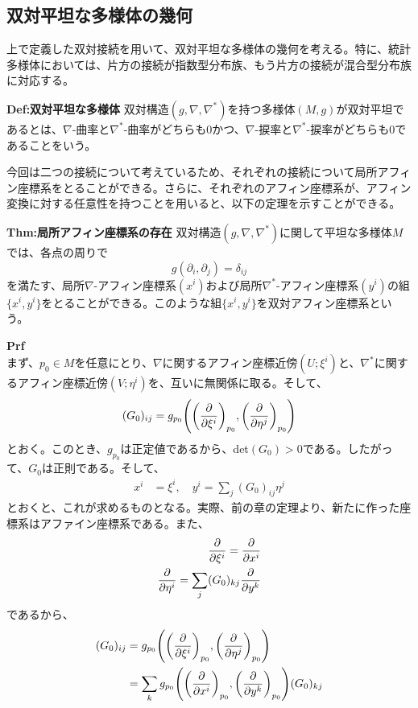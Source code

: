 \documentclass[a4paper,11pt]{jsarticle}
\numberwithin{equation}{section}
\begin{document}
\subsection{双対平坦な多様体の幾何}
上で定義した双対接続を用いて、双対平坦な多様体の幾何を考える。特に、統計多様体においては、片方の接続が指数型分布族、もう片方の接続が混合型分布族に対応する。\\
\begin{itembox}[l]{\textbf{Def:双対平坦な多様体}}
    双対構造$(g,\nabla,\nabla^*)$を持つ多様体$(M,g)$が双対平坦であるとは、$\nabla$-曲率と$\nabla^*$-曲率がどちらも0かつ、$\nabla$-捩率と$\nabla^*$-捩率がどちらも0であることをいう。
\end{itembox}
今回は二つの接続について考えているため、それぞれの接続について局所アフィン座標系をとることができる。さらに、それぞれのアフィン座標系が、アフィン変換に対する任意性を持つことを用いると、以下の定理を示すことができる。
\begin{itembox}[l]{\textbf{Thm:局所アフィン座標系の存在}}
    双対構造$(g,\nabla,\nabla^*)$に関して平坦な多様体$M$では、各点の周りで
    \begin{equation}
        g(\partial_i,\partial_j) = \delta_{ij}
    \end{equation}
    を満たす、局所$\nabla$-アフィン座標系$(x^i)$および局所$\nabla^*$-アフィン座標系$(y^i)$の組$\{x^i,y^i\}$をとることができる。このような組$\{x^i,y^i\}$を双対アフィン座標系という。 
\end{itembox}
    \textbf{Prf}\\
    まず、$p_0 \in M$を任意にとり、$\nabla$に関するアフィン座標近傍$(U;\xi^i)$と、$\nabla^*$に関するアフィン座標近傍$(V;\eta^i)$を、互いに無関係に取る。そして、
    \begin{equation}
        (G_0)_{ij} = g_{p_0}\qty(\qty(\pdv{\xi^i})_{p_0},\qty(\pdv{\eta^j})_{p_0})
    \end{equation}
    とおく。このとき、$g_{p_0}$は正定値であるから、det$(G_0) > 0$である。したがって、$G_0$は正則である。そして、
    \begin{align}
        x^i &= \xi^i,\quad y^i = \sum_{j} (G_0)_{ij} \eta^j
    \end{align}
    とおくと、これが求めるものとなる。実際、前の章の定理より、新たに作った座標系はアファイン座標系である。また、
    \begin{align}
        \pdv{\xi^i}= \pdv{x^i}\\
        \pdv{\eta^i} = \sum_{j} (G_0)_{kj} \pdv{y^k}
    \end{align}
    であるから、
    \begin{align}
        (G_0)_{ij} &= g_{p_0}\qty(\qty(\pdv{\xi^i})_{p_0},\qty(\pdv{\eta^j})_{p_0}) \\
        &= \sum_{k} g_{p_0}\qty(\qty(\pdv{x^i})_{p_0},\qty(\pdv{y^k})_{p_0}) (G_0)_{kj} \\
    \end{align}
\end{document}
